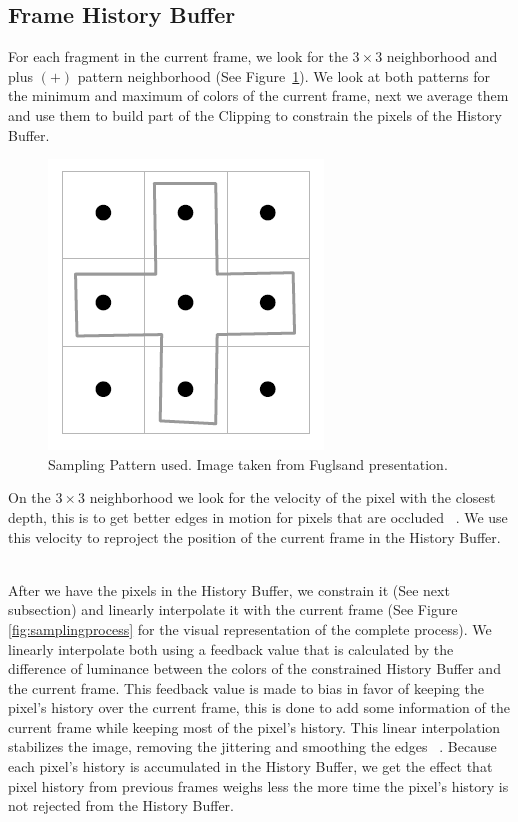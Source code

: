 \documentclass{cslthse-msc}
\begin{document}
\subsection{Frame History Buffer}
For each fragment in the current frame, we look for the $3\times 3$ neighborhood and plus $(+)$ pattern neighborhood (See Figure~\ref{fig:samplingpattern}). We look at both patterns for the minimum and maximum of colors of the current frame, next we average them and use them to build part of the Clipping to constrain the pixels of the History Buffer. ~\cite{Fuglsand2016}
\begin{figure}[!hbt]
	\centering
	\includegraphics[scale=0.8]{images/sampling_pattern.png}
	\caption{Sampling Pattern used. Image taken from Fuglsand presentation. \protect\cite{Fuglsand2016}}\label{fig:samplingpattern}
\end{figure}

On the $3\times 3$ neighborhood we look for the velocity of the pixel with the closest depth, this is to get better edges in motion for pixels that are occluded ~\cite{Fuglsand2016}. We use this velocity to reproject the position of the current frame in the History Buffer. ~\cite{Fuglsand2016,XU2016}

After we have the pixels in the History Buffer, we constrain it (See next subsection) and linearly interpolate it with the current frame (See Figure \ref{fig:samplingprocess} for the visual representation of the complete process). We linearly interpolate both using a feedback value that is calculated by the difference of luminance between the colors of the constrained History Buffer and the current frame. This feedback value is made to bias in favor of keeping the pixel’s history over the current frame, this is done to add some information of the current frame while keeping most of the pixel's history. This linear interpolation stabilizes the image, removing the jittering and smoothing the edges ~\cite{Fuglsand2016,XU2016}. Because each pixel's history is accumulated in the History Buffer, we get the effect that pixel history from previous frames weighs less the more time the pixel's history is not rejected from the History Buffer. ~\cite{Fuglsand2016}
\end{document}
